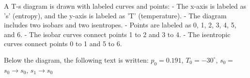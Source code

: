 A T-s diagram is drawn with labeled curves and points:  
- The x-axis is labeled as 's' (entropy), and the y-axis is labeled as 'T' (temperature).  
- The diagram includes two isobars and two isentropes.  
- Points are labeled as 0, 1, 2, 3, 4, 5, and 6.  
- The isobar curves connect points 1 to 2 and 3 to 4.  
- The isentropic curves connect points 0 to 1 and 5 to 6.  

Below the diagram, the following text is written:  
\( p_0 = 0.191 \), \( T_0 = -30^\circ \), \( s_0 = \)  
\( s_0 \rightarrow s_0 \), \( s_1 \rightarrow s_0 \)
